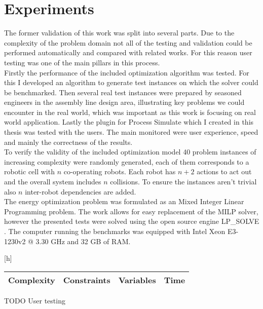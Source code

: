 \chapter{Experiments}

The former validation of this work was split into several parts. Due to the complexity of the problem domain not all of the testing and validation could be performed automatically and compared with related works. For this reason user testing was one of the main pillars in this process. \\

Firstly the performance of the included optimization algorithm was tested. For this I developed an algorithm to generate test instances on which the solver could be benchmarked. Then several real test instances were prepared by seasoned engineers in the assembly line design area, illustrating key problems we could encounter in the real world, which was important as this work is focusing on real world application. Lastly the plugin for Process Simulate which I created in this thesis was tested with the users. The main monitored were user experience, speed and mainly the correctness of the results. \\

To verify the validity of the included optimization model 40 problem instances of increasing complexity were randomly generated, each of them corresponds to a robotic cell with $n$ co-operating robots. Each robot has $n + 2$ actions to act out and the overall system includes $n$ collisions. To ensure the instances aren't trivial also $n$ inter-robot dependencies are added. \\

The energy optimization problem was formulated as an Mixed Integer Linear Programming problem. The work allows for easy replacement of the MILP solver, however the presented tests were solved using the open source engine LP_SOLVE \cite{http://lpsolve.sourceforge.net}. The computer running the benchmarks was equipped with Intel Xeon E3-1230v2 @ 3.30 GHz \cite{https://ark.intel.com/products/65732/Intel-Xeon-Processor-E3-1230-v2-8M-Cache-3_30-GHz} and 32 GB of RAM. \\

\begin{center}[h]
\begin{tabular}{|c|c|c|c|}
    \hline
    Complexity & Constraints & Variables & Time \\
    \hline
    
    \hline
\end{tabular}
\end{center}

TODO User testing \\